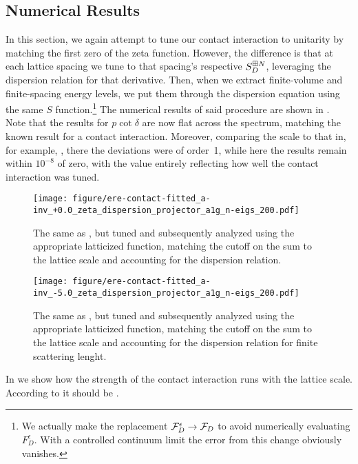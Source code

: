 \subsection{Numerical Results}

In this section, we again attempt to tune our contact interaction to unitarity by matching the first zero of the \Luscher zeta function.
However, the difference is that at each lattice spacing we tune to that spacing's respective $S^{\boxplus N}_D$, leveraging the dispersion relation for that derivative.
Then, when we extract finite-volume and finite-spacing energy levels, we put them through the dispersion equation  using the same $S$ function.\footnote{We actually make the replacement $\mathcal{F}_D^\epsilon\rightarrow\mathcal{F}_D$ to avoid numerically evaluating $F_D^\epsilon$.  With a controlled continuum limit the error from this change obviously vanishes.}
The numerical results of said procedure are shown in .
Note that the results for $p\cot\delta$ are now flat across the spectrum, matching the known result for a contact interaction.
Moreover, comparing the scale to that in, for example, , there the deviations were of order~1, while here the results remain within $10^{-8}$ of zero, with the value entirely reflecting how well the contact interaction was tuned.

\begin{figure}
    \texttt{[image: figure/ere-contact-fitted\_a-inv\_+0.0\_zeta\_dispersion\_projector\_a1g\_n-eigs\_200.pdf]}
    \caption{The same as , but tuned and subsequently analyzed using the appropriate latticized \Luscher function, matching the cutoff on the sum to the lattice scale and accounting for the dispersion relation.}
    \label{fig:unimproved dispersion}
\end{figure}

\begin{figure}[th]
    \texttt{[image: figure/ere-contact-fitted\_a-inv\_-5.0\_zeta\_dispersion\_projector\_a1g\_n-eigs\_200.pdf]}
    \caption{The same as , but tuned and subsequently analyzed using the appropriate latticized \Luscher function, matching the cutoff on the sum to the lattice scale and accounting for the dispersion relation for finite scattering lenght.}
    \label{fig:unimproved dispersion finite a}
\end{figure}

In  we show how the strength of the contact interaction runs with the lattice scale.  According to  it should be .

